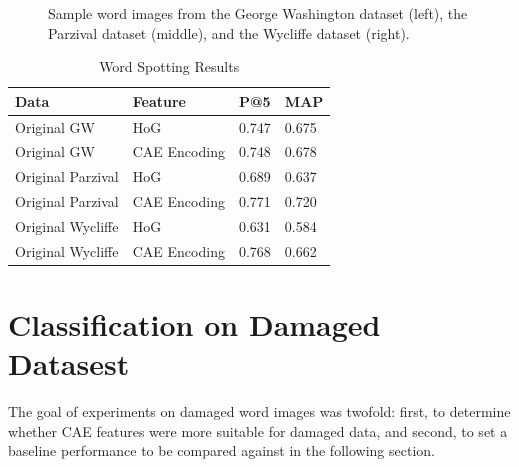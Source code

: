\documentclass[final]{ukthesis}
\begin{document}
\begin{figure}[t]
\begin{center}
\end{center}
\caption{Sample word images from the George Washington dataset (left), the Parzival dataset (middle), and the Wycliffe dataset (right).}
\label{fig:word-samples}
\end{figure}

\begin{table}[h]
\centering
\begin{tabular}{llll}
\textbf{Data}  & \textbf{Feature} & \textbf{P@5} & \textbf{MAP} \\
\hline
Original GW    & HoG			& 0.747          & 0.675          \\
Original GW    & CAE Encoding 	& 0.748          & 0.678          \\
Original Parzival & HoG                     & 0.689          & 0.637          \\
Original Parzival & CAE Encoding 	& 0.771          & 0.720          \\
Original Wycliffe & HoG			& 0.631          & 0.584          \\
Original Wycliffe & CAE Encoding	& 0.768          & 0.662         
\end{tabular}
\caption{Word Spotting Results}
\label{tab:word-spotting}
\end{table}




%
%
\section{Classification on Damaged Datasest}
\label{sec:damaged-results}
The goal of experiments on damaged word images was twofold: first, to determine whether CAE features were more suitable for damaged data, and second, to set a baseline performance to be compared against in the following section.
\end{document}
